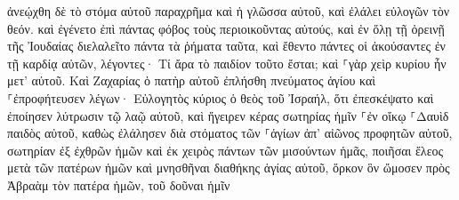\documentclass{openreader}
\begin{document}
ἀνεῴχθη δὲ τὸ στόμα αὐτοῦ παραχρῆμα καὶ ἡ γλῶσσα αὐτοῦ, καὶ ἐλάλει εὐλογῶν τὸν θεόν. 
καὶ ἐγένετο ἐπὶ πάντας φόβος τοὺς περιοικοῦντας αὐτούς, καὶ ἐν ὅλῃ τῇ ὀρεινῇ τῆς Ἰουδαίας διελαλεῖτο πάντα τὰ ῥήματα ταῦτα, 
καὶ ἔθεντο πάντες οἱ ἀκούσαντες ἐν τῇ καρδίᾳ αὐτῶν, λέγοντες· Τί ἄρα τὸ παιδίον τοῦτο ἔσται; καὶ ⸀γὰρ χεὶρ κυρίου ἦν μετ’ αὐτοῦ. 
Καὶ Ζαχαρίας ὁ πατὴρ αὐτοῦ ἐπλήσθη πνεύματος ἁγίου καὶ ⸀ἐπροφήτευσεν λέγων· 
Εὐλογητὸς κύριος ὁ θεὸς τοῦ Ἰσραήλ, ὅτι ἐπεσκέψατο καὶ ἐποίησεν λύτρωσιν τῷ λαῷ αὐτοῦ, 
καὶ ἤγειρεν κέρας σωτηρίας ἡμῖν ⸀ἐν οἴκῳ ⸀Δαυὶδ παιδὸς αὐτοῦ, 
καθὼς ἐλάλησεν διὰ στόματος τῶν ⸀ἁγίων ἀπ’ αἰῶνος προφητῶν αὐτοῦ, 
σωτηρίαν ἐξ ἐχθρῶν ἡμῶν καὶ ἐκ χειρὸς πάντων τῶν μισούντων ἡμᾶς, 
ποιῆσαι ἔλεος μετὰ τῶν πατέρων ἡμῶν καὶ μνησθῆναι διαθήκης ἁγίας αὐτοῦ, 
ὅρκον ὃν ὤμοσεν πρὸς Ἀβραὰμ τὸν πατέρα ἡμῶν, τοῦ δοῦναι ἡμῖν 
\end{document}
